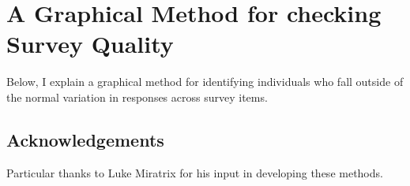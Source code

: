 \chapter{A Graphical Method for checking Survey Quality}
\label{chap:attitude-quality}

Below, I explain a graphical method for identifying individuals who fall outside
of the normal variation in responses across survey items.

\section*{Acknowledgements}

Particular thanks to Luke Miratrix for his input in developing these methods.

